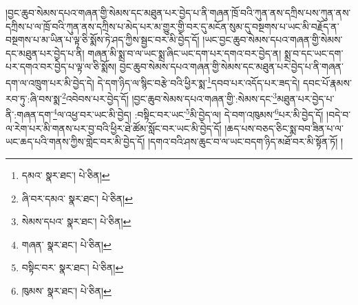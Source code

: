 །བྱང་ཆུབ་སེམས་དཔའ་གཞན་གྱི་སེམས་དང་མཐུན་པར་བྱེད་པ་ནི་གཞན་ཁྲོ་བའི་ཀུན་ནས་དཀྲིས་པས་ཀུན་ནས་དཀྲིས་པ་ལ་ཁྲོ་བའི་ཀུན་ནས་དཀྲིས་པ་མེད་པར་མ་གྱུར་གྱི་བར་དུ་མངོན་སུམ་དུ་བསྔགས་པ་ཡང་མི་བརྗོད་ན་བསྔགས་པ་མ་ཡིན་པ་ལྟ་ཅི་སྨོས་ཏེ་ཤད་ཀྱིས་སྦྱང་བར་མི་བྱེད་དོ། །ཡང་བྱང་ཆུབ་སེམས་དཔའ་གཞན་གྱི་སེམས་དང་མཐུན་པར་བྱེད་པ་ནི། གཞན་མི་སྨྲ་བ་ལ་ཡང་སྨྲ་ཞིང་ཡང་དག་པར་དགའ་བར་བྱེད་ན། སྨྲ་བ་དང་ཡང་དག་པར་དགའ་བར་བྱེད་པ་ལྟ་ལ་ཅི་སྨོས། བྱང་ཆུབ་སེམས་དཔའ་གཞན་གྱི་སེམས་དང་མཐུན་པར་བྱེད་པ་ནི་གཞན་དག་ལ་འཁྲུག་པར་མི་བྱེད་དེ། དེ་དག་ཉིད་ལ་སྙིང་བརྩེ་བའི་ཕྱིར་སྨ་\footnote{དམའ་  སྣར་ཐང་།  པེ་ཅིན། }དབབ་པར་འདོད་པར་ཟད་དེ། དབང་པོ་རྣམས་རབ་ཏུ་:ཞི་བས་སྨ་\footnote{ཞི་བར་དམའ་  སྣར་ཐང་།  པེ་ཅིན། }འབེབས་པར་བྱེད་དོ། །བྱང་ཆུབ་སེམས་དཔའ་གཞན་གྱི་:སེམས་དང་\footnote{སེམས་དཔའ་  སྣར་ཐང་།  པེ་ཅིན། }མཐུན་པར་བྱེད་པ་ནི་:གཞན་དག་\footnote{གཞན་  སྣར་ཐང་།  པེ་ཅིན། }ལ་འཕྱ་བར་ཡང་མི་བྱེད། :བསྟིང་བར་ཡང་\footnote{བསྟིང་བར་  སྣར་ཐང་།  པེ་ཅིན། }མི་བྱེད་ལ། དེ་བག་འཁུམས་\footnote{ཁུམས་  སྣར་ཐང་།  པེ་ཅིན། }པར་མི་བྱེད་དོ། །བདེ་བ་ལ་རེག་པར་མི་གནས་པར་བྱ་བའི་ཕྱིར་ཐེ་ཚོམ་སློང་བར་ཡང་མི་བྱེད་དོ། །ཆད་པས་བཅད་ཅིང་སྨ་བབ་ཟིན་པ་ལ་ཡང་ཆད་པའི་གནས་ཀྱིས་གླེང་བར་མི་བྱེད་དོ། །དགའ་བའི་ཤས་ཆུང་བ་ལ་ཡང་བདག་ཉིད་མཐོ་བར་མི་སྟོན་ཏོ། །
